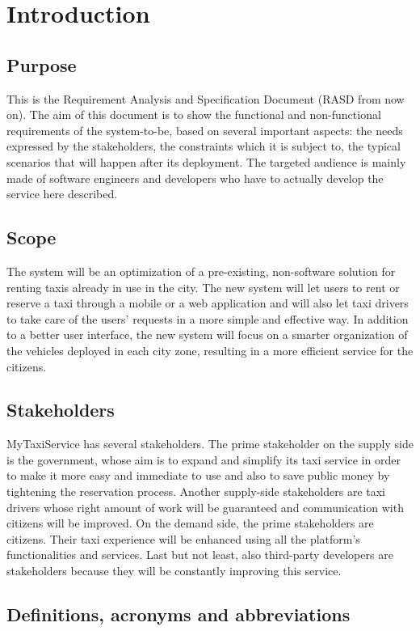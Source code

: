 \section{Introduction}

\subsection{Purpose}
This is the Requirement Analysis and Specification Document (RASD from now on). The aim of this document is to show the functional and non-functional requirements of the system-to-be, based on several important aspects: the needs expressed by the stakeholders, the constraints which it is subject to, the typical scenarios that will happen after its deployment. The targeted audience is mainly made of software engineers and developers who have to actually develop the service here described.

\subsection{Scope}
The system will be an optimization of a pre-existing, non-software solution for renting taxis already in use in the city. The new system will let users to rent or reserve a taxi through a mobile or a web application and will also let taxi drivers to take care of the users' requests in a more simple and effective way. In addition to a better user interface, the new system will focus on a smarter organization of the vehicles deployed in each city zone, resulting in a more efficient service for the citizens.

\subsection{Stakeholders}
MyTaxiService has several stakeholders.
The prime stakeholder on the supply side is the government, whose aim is to expand and simplify its taxi service in order to make it more easy and immediate to use and also to save public money by tightening the reservation process.
Another supply-side stakeholders are taxi drivers whose right amount of work will be guaranteed and communication with citizens will be improved.
On the demand side, the prime stakeholders are citizens. Their taxi experience will be enhanced using all the platform's functionalities and services.
Last but not least, also third-party developers are stakeholders because they will be constantly improving this service.

\subsection{Definitions, acronyms and abbreviations}
